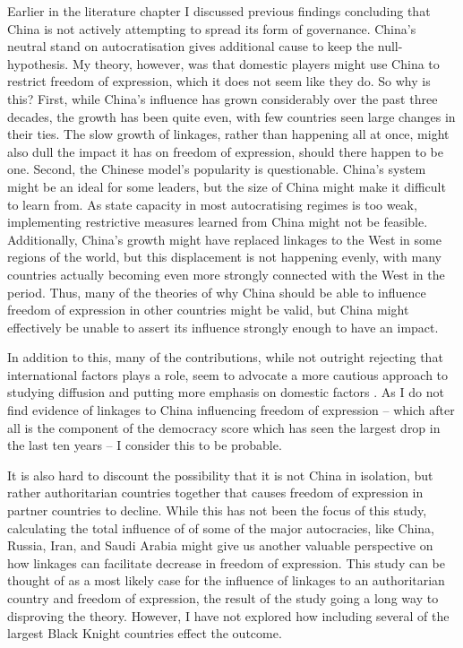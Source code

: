 Earlier in the literature chapter I discussed previous findings concluding that China is not actively attempting to spread its form of governance. China's neutral stand on autocratisation gives additional cause to keep the null-hypothesis. My theory, however, was that domestic players might use China to restrict freedom of expression, which it does not seem like they do. So why is this? First, while China's influence has grown considerably over the past three decades, the growth has been quite even, with few countries seen large changes in their ties. The slow growth of linkages, rather than happening all at once, might also dull the impact it has on freedom of expression, should there happen to be one. Second, the Chinese model's popularity is questionable. China's system might be an ideal for some leaders, but the size of China might make it difficult to learn from. As state capacity in most autocratising regimes is too weak, implementing restrictive measures learned from China might not be feasible. Additionally, China's growth might have replaced linkages to the West in some regions of the world, but this displacement is not happening evenly, with many countries actually becoming even more strongly connected with the West in the period. Thus, many of the theories of why China should be able to influence freedom of expression in other countries might be valid, but China might effectively be unable to assert its influence strongly enough to have an impact.

In addition to this, many of the contributions, while not outright rejecting that international factors plays a role, seem to advocate a more cautious approach to studying diffusion and putting more emphasis on domestic factors \citep{bader_china_2015, buzogany_illiberal_2017, borzel_noble_2015, risse_democracy_2015}. As I do not find evidence of linkages to China influencing freedom of expression -- which after all is the component of the democracy score which has seen the largest drop in the last ten years -- I consider this to be probable. 

It is also hard to discount the possibility that it is not China in isolation, but rather authoritarian countries together that causes freedom of expression in partner countries to decline. While this has not been the focus of this study, calculating the total influence of of some of the major autocracies, like China, Russia, Iran, and Saudi Arabia might give us another valuable perspective on how linkages can facilitate decrease in freedom of expression. This study can be thought of as a most likely case for the influence of linkages to an authoritarian country and freedom of expression, the result of the study going a long way to disproving the theory. However, I have not explored how including several of the largest Black Knight countries effect the outcome. 


